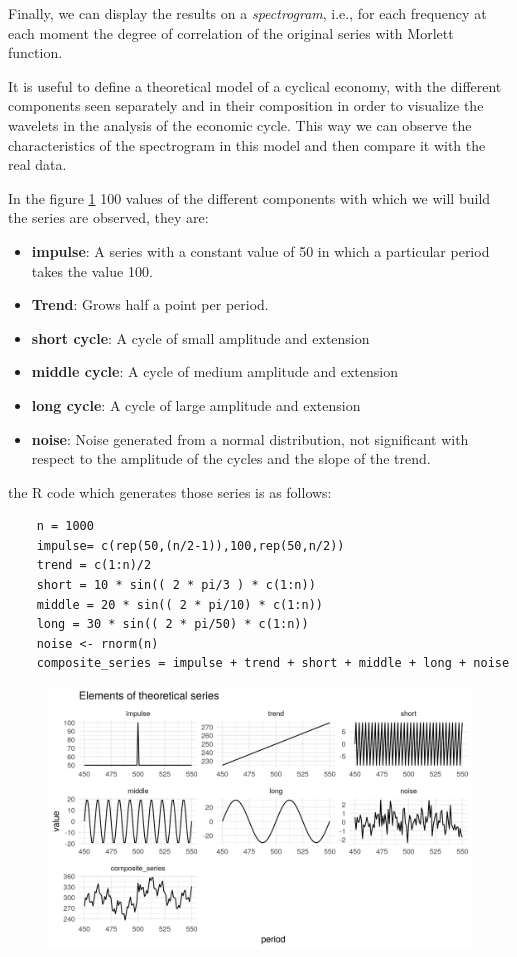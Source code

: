 \documentclass[a4paper]{article}
\begin{document}
	Finally, we can display the results on a \textit{spectrogram}, i.e., for each frequency at each moment the degree of correlation of the original series with Morlett function.
	
	
	It is useful to define a theoretical model of a cyclical economy, with the different components seen separately and in their composition in order to visualize the wavelets in the analysis of the economic cycle. This way we can observe the characteristics of the spectrogram in this model and then compare it with the real data.
	
	In the figure \ref{fig:serie_teorica} 100 values of the different components with which we will build the series are observed, they are:
	
	
	\begin{itemize}
		
		\item \textbf{impulse}: A series with a constant value of 50 in which a particular period takes the value 100.
		\item \textbf{Trend}: Grows half a point per period.
		\item \textbf{short cycle}: A cycle of small amplitude and extension
		\item \textbf{middle cycle}: A cycle of medium amplitude and extension
		\item \textbf{long cycle}: A cycle of large amplitude and extension
		\item \textbf{noise}: Noise generated from a normal distribution, not significant with respect to the amplitude of the cycles and the slope of the trend.
	\end{itemize}
	
	the R code which generates those series is as follows:
	
	\begin{lstlisting}
	n = 1000
	impulse= c(rep(50,(n/2-1)),100,rep(50,n/2))
	trend = c(1:n)/2
	short = 10 * sin(( 2 * pi/3 ) * c(1:n))
	middle = 20 * sin(( 2 * pi/10) * c(1:n))
	long = 30 * sin(( 2 * pi/50) * c(1:n))
	noise <- rnorm(n)
	composite_series = impulse + trend + short + middle + long + noise
	\end{lstlisting}
	
	
	\begin{figure}[H]
		\centering
		\includegraphics[width=\linewidth]{serie_teorica_en.PNG}
		\caption{} \label{fig:serie_teorica}
	\end{figure}
	
\end{document}
